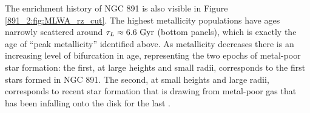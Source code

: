 The enrichment history of NGC 891 is also visible in Figure
\ref{891_2:fig:MLWA_rz_cut}. The highest metallicity populations have
ages narrowly scattered around $\tau_L \approx 6.6~\mathrm{Gyr} $ (bottom
panels), which is exactly the age of ``peak metallicity'' identified
above. As metallicity decreases there is an increasing level of
bifurcation in age, representing the two epochs of metal-poor star
formation: the first, at large heights and small radii, corresponds to
the first stars formed in NGC 891. The second, at small heights and
large radii, corresponds to recent star formation that is drawing from
metal-poor gas that has been infalling onto the disk for the last
.







